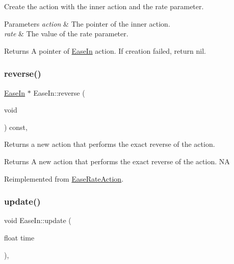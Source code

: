 Create the action with the inner action and the rate parameter. 


\begin{DoxyParams}{Parameters}
{\em action} & The pointer of the inner action. \\
\hline
{\em rate} & The value of the rate parameter. \\
\hline
\end{DoxyParams}
\begin{DoxyReturn}{Returns}
A pointer of \hyperlink{classEaseIn}{Ease\+In} action. If creation failed, return nil. 
\end{DoxyReturn}
\mbox{\label{classEaseIn_adc23609d0a863b45012b4b6361178728}} 
\subsubsection{\texorpdfstring{reverse()}{reverse()}}
{\footnotesize\ttfamily \hyperlink{classEaseIn}{Ease\+In} $\ast$ Ease\+In\+::reverse (\begin{DoxyParamCaption}\item[{void}]{ }\end{DoxyParamCaption}) const\hspace{0.3cm}{\ttfamily [override]}, {\ttfamily [virtual]}}

Returns a new action that performs the exact reverse of the action.

\begin{DoxyReturn}{Returns}
A new action that performs the exact reverse of the action.  NA 
\end{DoxyReturn}


Reimplemented from \hyperlink{classEaseRateAction_acd2b87a3358e01fa74a726634dcd41fb}{Ease\+Rate\+Action}.

\mbox{\label{classEaseIn_a9a03c0c893472d723d2d905e5fd39856}} 
\subsubsection{\texorpdfstring{update()}{update()}}
{\footnotesize\ttfamily void Ease\+In\+::update (\begin{DoxyParamCaption}\item[{float}]{time }\end{DoxyParamCaption})\hspace{0.3cm}{\ttfamily [override]}, {\ttfamily [virtual]}}

